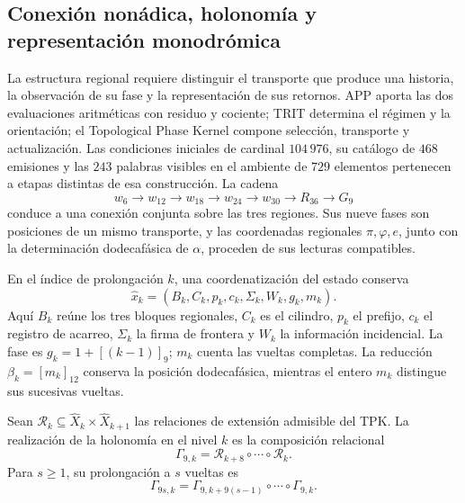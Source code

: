 \subsection{Conexión nonádica, holonomía y representación monodrómica}
\label{mono-ampl:conexion}

La estructura regional requiere distinguir el transporte que produce una
historia, la observación de su fase y la representación de sus retornos.
APP aporta las dos evaluaciones aritméticas con residuo y cociente; TRIT
determina el régimen y la orientación; el Topological Phase Kernel compone
selección, transporte y actualización. Las condiciones iniciales de
cardinal \(104\,976\), su catálogo de \(468\) emisiones y las \(243\)
palabras visibles en el ambiente de \(729\) elementos pertenecen a etapas
distintas de esa construcción. La cadena
\[
 w_6\longrightarrow w_{12}\longrightarrow w_{18}
 \longrightarrow w_{24}\longrightarrow w_{30}
 \longrightarrow R_{36}\longrightarrow G_9
\]
conduce a una conexión conjunta sobre las tres regiones. Sus nueve fases
son posiciones de un mismo transporte, y las coordenadas regionales
\(\pi,\varphi,e\), junto con la determinación dodecafásica de \(\alpha\),
proceden de sus lecturas compatibles\cite{hmtintegral,hmtholonomia}.

En el índice de prolongación \(k\), una coordenatización del estado conserva
\[
 \widehat x_k=(B_k,C_k,p_k,c_k,\Sigma_k,W_k,g_k,m_k).
\]
Aquí \(B_k\) reúne los tres bloques regionales, \(C_k\) es el cilindro,
\(p_k\) el prefijo, \(c_k\) el registro de acarreo, \(\Sigma_k\) la firma
de frontera y \(W_k\) la información incidencial. La fase es
\(g_k=1+[(k-1)]_9\); \(m_k\) cuenta las vueltas completas. La reducción
\(\beta_k=[m_k]_{12}\) conserva la posición dodecafásica, mientras el
entero \(m_k\) distingue sus sucesivas vueltas.

\begin{definition}
\label{mono-ampl:def-vuelta}
Sean \(\mathcal R_k\subseteq\widehat X_k\times\widehat X_{k+1}\)
las relaciones de extensión admisible del TPK. La realización de la
holonomía en el nivel \(k\) es la composición relacional
\[
 \Gamma_{9,k}=\mathcal R_{k+8}\circ\cdots\circ\mathcal R_k.
\]
Para \(s\geq1\), su prolongación a \(s\) vueltas es
\[
 \Gamma_{9s,k}=
 \Gamma_{9,k+9(s-1)}\circ\cdots\circ\Gamma_{9,k}.
\]
\end{definition}


